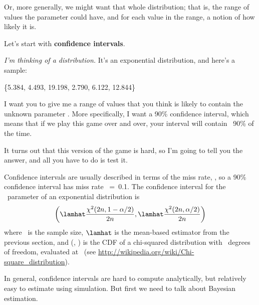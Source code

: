 \documentclass[12pt]{book}
\begin{document}
Or, more generally, we might want that whole distribution; that is,
the range of values the parameter could have, and for each value in
the range, a notion of how likely it is.

Let's start with {\bf confidence intervals}.

{\em I'm thinking of a distribution.}  It's an exponential distribution, and 
here's a sample:

\{5.384, 4.493, 19.198, 2.790, 6.122, 12.844\}

I want you to give me a range of values that you think is likely to
contain the unknown parameter \mylambda.  More specifically, I want
a 90\% confidence interval, which means that if we play this game over
and over, your interval will contain \mylambda~90\% of the time.

It turns out that this version of the game is hard, so I'm going
to tell you the answer, and all you have to do is test it.

Confidence intervals are usually described in terms of the miss rate,
\myalpha, so a 90\% confidence interval has miss rate \myalpha~=~0.1.
The confidence interval for the \mylambda~parameter of an exponential
distribution is
%
\[ \left( \lamhat \frac{\chi^2(2n, 1-\alpha/2)}{2n},
      \lamhat \frac{\chi^2(2n, \alpha/2)}{2n} \right) \]
% 
where \n~is the sample size, $\lamhat$ is the mean-based estimator
      from the previous section, and \mychi{}(\kk, \x) is the
      CDF of a chi-squared distribution with \kk~degrees of freedom,
      evaluated at \x~(see
      \url{http://wikipedia.org/wiki/Chi-square_distribution}).
       

In general, confidence intervals are hard to compute analytically, but
relatively easy to estimate using simulation.  But first we need
to talk about Bayesian estimation.





\end{document}
